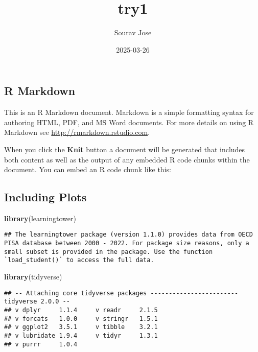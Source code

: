 \documentclass[
]{article}
\title{try1}
\author{Sourav Jose}
\date{2025-03-26}
\newenvironment{Shaded}{\begin{snugshade}}{\end{snugshade}}
\newcommand{\FunctionTok}[1]{\textcolor[rgb]{0.13,0.29,0.53}{\textbf{#1}}}
\newcommand{\NormalTok}[1]{#1}
\begin{document}
\maketitle

\subsection{R Markdown}\label{r-markdown}

This is an R Markdown document. Markdown is a simple formatting syntax
for authoring HTML, PDF, and MS Word documents. For more details on
using R Markdown see \url{http://rmarkdown.rstudio.com}.

When you click the \textbf{Knit} button a document will be generated
that includes both content as well as the output of any embedded R code
chunks within the document. You can embed an R code chunk like this:

\subsection{Including Plots}\label{including-plots}

\begin{Shaded}
\begin{Highlighting}[]
\FunctionTok{library}\NormalTok{(learningtower)}
\end{Highlighting}
\end{Shaded}

\begin{verbatim}
## The learningtower package (version 1.1.0) provides data from OECD PISA database between 2000 - 2022. For package size reasons, only a small subset is provided in the package. Use the function `load_student()` to access the full data.
\end{verbatim}

\begin{Shaded}
\begin{Highlighting}[]
\FunctionTok{library}\NormalTok{(tidyverse)}
\end{Highlighting}
\end{Shaded}

\begin{verbatim}
## -- Attaching core tidyverse packages ------------------------ tidyverse 2.0.0 --
## v dplyr     1.1.4     v readr     2.1.5
## v forcats   1.0.0     v stringr   1.5.1
## v ggplot2   3.5.1     v tibble    3.2.1
## v lubridate 1.9.4     v tidyr     1.3.1
## v purrr     1.0.4
\end{verbatim}
\end{document}
